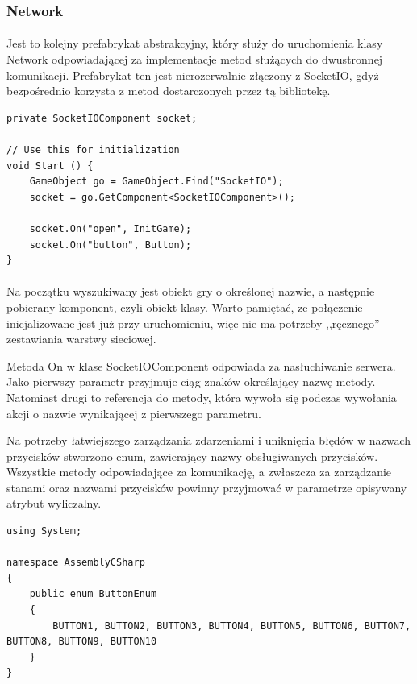 \subsubsection{Network}
\paragraph{}
Jest to kolejny prefabrykat abstrakcyjny, który służy do uruchomienia klasy Network odpowiadającej za implementacje metod służących do dwustronnej komunikacji.
Prefabrykat ten jest nierozerwalnie złączony z SocketIO, gdyż bezpośrednio korzysta z metod dostarczonych przez tą bibliotekę.


\begin{lstlisting}[language=CSharp]
private SocketIOComponent socket;

// Use this for initialization
void Start () {
	GameObject go = GameObject.Find("SocketIO");
	socket = go.GetComponent<SocketIOComponent>();

	socket.On("open", InitGame);
	socket.On("button", Button);
}
\end{lstlisting}

\paragraph{}
Na początku wyszukiwany jest obiekt gry o określonej nazwie, a następnie pobierany komponent, czyli obiekt klasy. Warto pamiętać, ze połączenie inicjalizowane jest już przy uruchomieniu, więc nie ma potrzeby ,,ręcznego'' zestawiania warstwy sieciowej.

Metoda On w klase SocketIOComponent odpowiada za nasłuchiwanie serwera. Jako pierwszy parametr przyjmuje ciąg znaków określający nazwę metody. Natomiast drugi to referencja do metody, która wywoła się podczas wywołania akcji o nazwie wynikającej z pierwszego parametru.

Na potrzeby łatwiejszego zarządzania zdarzeniami i uniknięcia błędów w nazwach przycisków stworzono enum, zawierający nazwy obsługiwanych przycisków. Wszystkie metody odpowiadające za komunikację, a zwłaszcza za zarządzanie stanami oraz nazwami przycisków powinny przyjmować w parametrze opisywany atrybut wyliczalny.

\begin{lstlisting}[language=CSharp]
using System;

namespace AssemblyCSharp
{
	public enum ButtonEnum
	{
		BUTTON1, BUTTON2, BUTTON3, BUTTON4, BUTTON5, BUTTON6, BUTTON7, BUTTON8, BUTTON9, BUTTON10
	}
}

\end{lstlisting}

